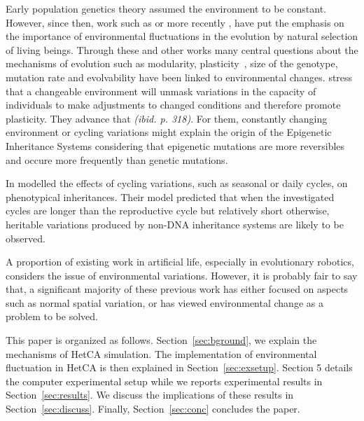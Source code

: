 \documentclass[letterpaper]{article}
\begin{document}
Early population genetics theory assumed the environment to be constant. However, since then, work such as \citep{levins1968evolution} or more recently \citep{jablonka2014evolution}, have put the emphasis on the importance of environmental fluctuations in the evolution by natural selection of living beings. Through these and other works many central questions about the mechanisms of evolution such as modularity, plasticity~\citep{west2005developmental}, size of the genotype, mutation rate and evolvability have been linked to environmental changes. \cite{jablonka2014evolution} stress that a changeable environment will unmask variations in the capacity of individuals to make adjustments to changed conditions and therefore promote plasticity. They advance that \emph{(ibid. p. 318)}. For them, constantly changing environment or cycling variations might explain the origin of the Epigenetic Inheritance Systems  considering that epigenetic mutations are more reversibles and occure more frequently than genetic mutations. 

In \cite{lachmann1996inheritance} modelled the effects of cycling variations, such as seasonal or daily cycles, on phenotypical inheritances. Their model predicted that when the investigated cycles are longer than the reproductive cycle but relatively short otherwise, heritable variations produced by non-DNA inheritance systems are likely to be observed.

A proportion of existing work in artificial life, especially in evolutionary robotics\citep{floreano2000evolutionary}, considers the issue of environmental variations. However, it is probably fair to say that, a significant majority of these previous work has either focused on aspects such as normal spatial variation, or has viewed environmental change as a problem to be solved.

This paper is organized as follows. Section~\ref{sec:bground}, we explain the mechanisms of HetCA simulation. The implementation of environmental fluctuation in HetCA is then explained in Section~\ref{sec:exsetup}. Section 5 details the computer experimental setup while we reports experimental results in Section~\ref{sec:results}. We discuss the implications of these results in Section~\ref{sec:discuss}. Finally, Section~\ref{sec:conc} concludes the paper.
\end{document}
